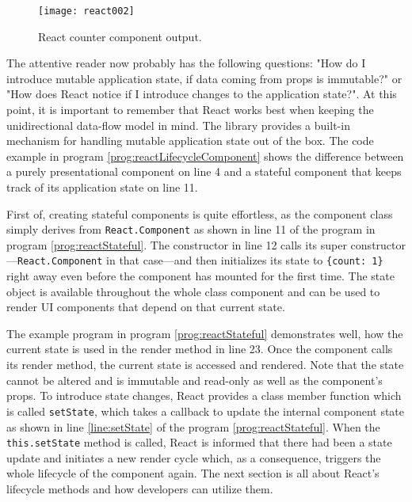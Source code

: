 \begin{figure}
  \centering
  \texttt{[image: react002]}
  \caption{React counter component output.}
  \label{fig:reactCounterComponent}
\end{figure}

The attentive reader now probably has the following questions: "How do I introduce mutable application state, if data coming from props is immutable?" or "How does React notice if I introduce changes to the application state?". At this point, it is important to remember that React works best when keeping the unidirectional data-flow model in mind. The library provides a built-in mechanism for handling mutable application state out of the box. The code example in program \ref{prog:reactLifecycleComponent} shows the difference between a purely presentational component on line 4 and a stateful component that keeps track of its application state on line 11.

First of, creating stateful components is quite effortless, as the component class simply derives from \texttt{React.Component} as shown in line 11 of the program in program \ref{prog:reactStateful}. The constructor in line 12 calls its super constructor---\texttt{React.Component} in that case---and then initializes its state to \texttt{\{count: 1\}} right away even before the component has mounted for the first time. The state object is available throughout the whole class component and can be used to render UI components that depend on that current state.

The example program in program \ref{prog:reactStateful} demonstrates well, how the current state is used in the render method in line 23. Once the component calls its render method, the current state is accessed and rendered. Note that the state cannot be altered and is immutable and read-only as well as the component's props. To introduce state changes, React provides a class member function which is called \texttt{setState}, which takes a callback to update the internal component state as shown in line \ref{line:setState} of the program \ref{prog:reactStateful}. When the \texttt{this.setState} method is called, React is informed that there had been a state update and initiates a new render cycle which, as a consequence, triggers the whole lifecycle of the component again. The next section is all about React's lifecycle methods and how developers can utilize them.




